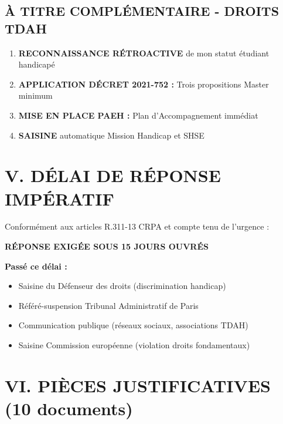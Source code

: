\documentclass[12pt,french]{scrlttr2}
\begin{document}
\begin{letter}
\subsection*{\colorbox{blue!20}{À TITRE COMPLÉMENTAIRE - DROITS TDAH}}

\begin{enumerate}
\item \textbf{RECONNAISSANCE RÉTROACTIVE} de mon statut étudiant handicapé
\item \textbf{APPLICATION DÉCRET 2021-752 :} Trois propositions Master minimum
\item \textbf{MISE EN PLACE PAEH :} Plan d'Accompagnement immédiat
\item \textbf{SAISINE} automatique Mission Handicap et SHSE
\end{enumerate}

\section*{V. DÉLAI DE RÉPONSE IMPÉRATIF}

Conformément aux articles R.311-13 CRPA et compte tenu de l'urgence :

\begin{center}
\colorbox{red!20}{\Large \textbf{RÉPONSE EXIGÉE SOUS 15 JOURS OUVRÉS}}
\end{center}

\textbf{Passé ce délai :}
\begin{itemize}
\item Saisine du Défenseur des droits (discrimination handicap)
\item Référé-suspension Tribunal Administratif de Paris
\item Communication publique (réseaux sociaux, associations TDAH)
\item Saisine Commission européenne (violation droits fondamentaux)
\end{itemize}

\section*{VI. PIÈCES JUSTIFICATIVES (10 documents)}


\end{letter}
\end{document}
